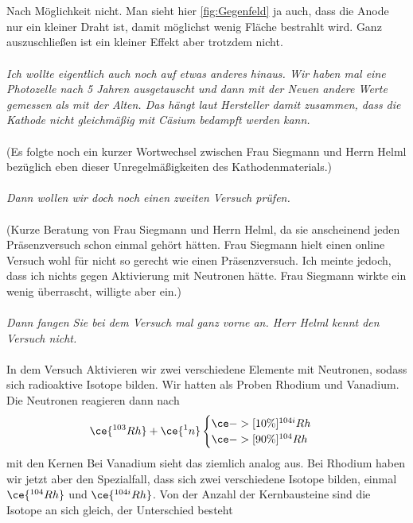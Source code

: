 \\\\\noindent
Nach Möglichkeit nicht. Man sieht hier \ref{fig:Gegenfeld} ja auch, dass die Anode nur ein kleiner Draht ist, damit möglichst wenig Fläche 
bestrahlt wird. Ganz auszuschließen ist ein kleiner Effekt aber trotzdem nicht. 
\\\\\noindent
\textit{Ich wollte eigentlich auch noch auf etwas anderes hinaus. Wir haben mal eine Photozelle nach 5 Jahren ausgetauscht und dann mit der 
Neuen andere Werte gemessen als mit der Alten. Das hängt laut Hersteller damit zusammen, dass die Kathode nicht gleichmäßig mit Cäsium 
bedampft werden kann.}
\\\\\noindent
(Es folgte noch ein kurzer Wortwechsel zwischen Frau Siegmann und Herrn Helml bezüglich eben dieser Unregelmäßigkeiten des Kathodenmaterials.)
\\\\\noindent
\textit{Dann wollen wir doch noch einen zweiten Versuch prüfen.}
\\\\\noindent
(Kurze Beratung von Frau Siegmann und Herrn Helml, da sie anscheinend jeden Präsenzversuch schon einmal gehört hätten. Frau Siegmann hielt 
einen online Versuch wohl für nicht so gerecht wie einen Präsenzversuch. Ich meinte jedoch, dass ich nichts gegen Aktivierung mit Neutronen
hätte. Frau Siegmann wirkte ein wenig überrascht, willigte aber ein.)
\\\\\noindent
\textit{Dann fangen Sie bei dem Versuch mal ganz vorne an. Herr Helml kennt den Versuch nicht.}
\\\\\noindent
In dem Versuch Aktivieren wir zwei verschiedene Elemente mit Neutronen, sodass sich radioaktive Isotope bilden. Wir hatten als Proben 
Rhodium und Vanadium. Die Neutronen reagieren dann nach 
\begin{equation}
        \ce{^{103}Rh}+\ce{^{1}n}
        \begin{cases}
            \ce{->[10\%]^{104 i}Rh}\\
            \ce{->[90\%]^{104}Rh}
        \end{cases}
\end{equation}
mit den Kernen
Bei Vanadium sieht das ziemlich analog aus. Bei Rhodium haben wir jetzt aber den Spezialfall, dass sich zwei verschiedene Isotope bilden, 
einmal $\ce{^{104}Rh}$ und $\ce{^{104i}Rh}$. Von der Anzahl der Kernbausteine sind die Isotope an sich gleich, der Unterschied besteht 
